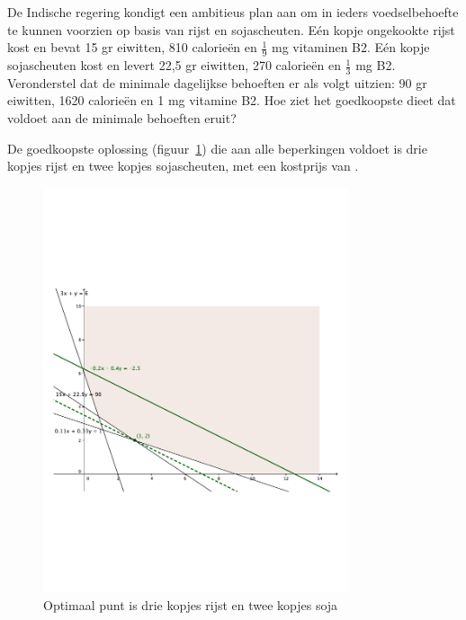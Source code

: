 \begin{oef}
De Indische regering kondigt een ambitieus plan aan om in
ieders voedselbehoefte te kunnen voorzien op basis van rijst en
sojascheuten. E\'{e}n kopje ongekookte rijst kost  en bevat
15 gr eiwitten, 810 calorie\"{e}n en $\frac{1}{9}$ mg vitaminen
B2. E\'{e}n kopje sojascheuten kost  en
levert 22,5 gr eiwitten, 270 calorie\"{e}n en $\frac{1}{3}$ mg
B2. Veronderstel dat de minimale dagelijkse
behoeften er als volgt uitzien: 90 gr eiwitten, 1620 calorie\"{e}n
en 1 mg vitamine B2.
Hoe ziet het goedkoopste
dieet dat voldoet aan de minimale behoeften eruit?
\begin{opl}
  De goedkoopste oplossing (figuur~\ref{fig:oplrijstsoja}) die aan alle beperkingen voldoet is drie kopjes rijst en twee kopjes sojascheuten, met een kostprijs van . 
  \begin{figure}[hbtp]
    \centering
    \includegraphics[width=0.8\textwidth]{oefeningen/FigurenLP/OefRijstSoja.pdf}
    \caption{Optimaal punt is drie kopjes rijst en twee kopjes soja}
    \label{fig:oplrijstsoja}
  \end{figure}
\end{opl}
\end{oef}
 
